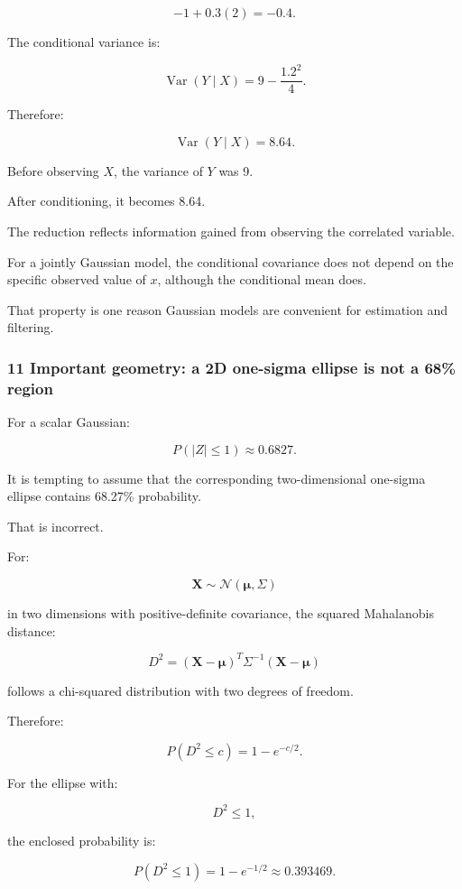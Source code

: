 \[
 -1+0.3(2) =\boxed{-0.4}.
\]

The conditional variance is:

\[
 \operatorname{Var}(Y\mid X) = 9-\frac{1.2^2}{4}.
\]

Therefore:

\[
 \boxed{ \operatorname{Var}(Y\mid X)=8.64 }.
\]

Before observing \(X\), the variance of \(Y\) was 9.

After conditioning, it becomes 8.64.

The reduction reflects information gained from observing the correlated variable.

For a jointly Gaussian model, the conditional covariance does not depend on the specific observed value of \(x\), although the conditional mean does.

That property is one reason Gaussian models are convenient for estimation and filtering.

\subsubsection{11 Important geometry: a 2D one-sigma ellipse is not a 68\% region}\label{02-foundations-ii-ch024-important-geometry-a-2d-one-sigma-ellipse-is-not-a-68-region}

For a scalar Gaussian:

\[
 P(|Z|\le1)\approx0.6827.
\]

It is tempting to assume that the corresponding two-dimensional one-sigma ellipse contains 68.27\% probability.

That is incorrect.

For:

\[
 \mathbf X\sim\mathcal N(\boldsymbol\mu,\Sigma)
\]

in two dimensions with positive-definite covariance, the squared Mahalanobis distance:

\[
 D^2= (\mathbf X-\boldsymbol\mu)^T \Sigma^{-1} (\mathbf X-\boldsymbol\mu)
\]

follows a chi-squared distribution with two degrees of freedom.

Therefore:

\[
 P(D^2\le c)=1-e^{-c/2}.
\]

For the ellipse with:

\[
 D^2\le1,
\]

the enclosed probability is:

\[
 \boxed{ P(D^2\le1)=1-e^{-1/2}\approx0.393469 }.
\]

